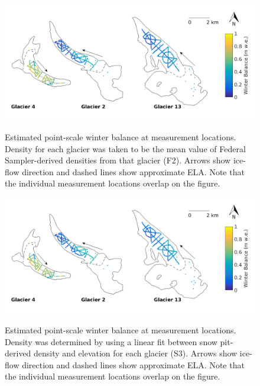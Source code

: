 \documentclass{sfuthesis}
\begin{document}
\begin{figure}
	\centering
	\includegraphics[width = \textwidth]{SWEmap_opt5.png}\\
	\caption{Estimated point-scale winter balance at measurement locations. Density for each glacier was taken to be the mean value of Federal Sampler-derived densities from that glacier (F2). Arrows show ice-flow direction and dashed lines show approximate ELA. Note that the individual measurement locations overlap on the figure.}
	\label{fig:SWEmap_F2}
\end{figure}

\begin{figure}
	\centering
	\includegraphics[width = \textwidth]{SWEmap_opt6.png}\\
	\caption{Estimated point-scale winter balance at measurement locations. Density was determined by using a linear fit between snow pit-derived density and elevation for each glacier (S3). Arrows show ice-flow direction and dashed lines show approximate ELA. Note that the individual measurement locations overlap on the figure.}
	\label{fig:SWEmap_S3}
\end{figure}
\end{document}

